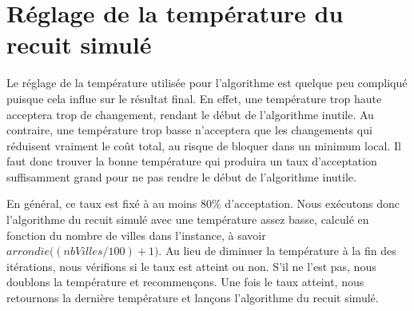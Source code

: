 \documentclass{article}
\begin{document}
\section{Réglage de la température du recuit simulé}

Le réglage de la température utilisée pour l'algorithme est quelque peu compliqué puisque cela influe sur le résultat final.
En effet, une température trop haute acceptera trop de changement, rendant le début de l'algorithme inutile.
Au contraire, une température trop basse n'acceptera que les changements qui réduisent vraiment le coût total, au risque de bloquer dans un minimum local.
Il faut donc trouver la bonne température qui produira un taux d'acceptation suffisamment grand pour ne pas rendre le début de l'algorithme inutile.

En général, ce taux est fixé à au moins 80\% d'acceptation.
Nous exécutons donc l'algorithme du recuit simulé avec une température assez basse, calculé en fonction du nombre de villes dans l'instance, à savoir $arrondie\big((nbVilles / 100) + 1\big)$.
Au lieu de diminuer la température à la fin des itérations, nous vérifions si le taux est atteint ou non.
S'il ne l'est pas, nous doublons la température et recommençons.
Une fois le taux atteint, nous retournons la dernière température et lançons l'algorithme du recuit simulé.
\end{document}

